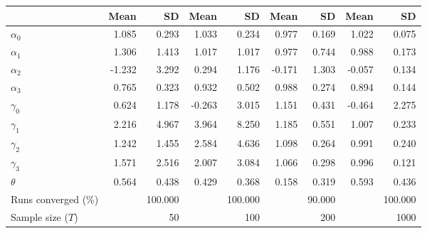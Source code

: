 
\begin{tabular}[t]{lrrrrrrrr}
\toprule
  & Mean & SD & Mean  & SD  & Mean   & SD   & Mean    & SD   \\
\midrule
$\alpha_{0}$ & 1.085 & 0.293 & 1.033 & 0.234 & 0.977 & 0.169 & 1.022 & 0.075\\
$\alpha_{1}$ & 1.306 & 1.413 & 1.017 & 1.017 & 0.977 & 0.744 & 0.988 & 0.173\\
$\alpha_{2}$ & -1.232 & 3.292 & 0.294 & 1.176 & -0.171 & 1.303 & -0.057 & 0.134\\
$\alpha_{3}$ & 0.765 & 0.323 & 0.932 & 0.502 & 0.988 & 0.274 & 0.894 & 0.144\\
$\gamma_{0}$ & 0.624 & 1.178 & -0.263 & 3.015 & 1.151 & 0.431 & -0.464 & 2.275\\
$\gamma_{1}$ & 2.216 & 4.967 & 3.964 & 8.250 & 1.185 & 0.551 & 1.007 & 0.233\\
$\gamma_{2}$ & 1.242 & 1.455 & 2.584 & 4.636 & 1.098 & 0.264 & 0.991 & 0.240\\
$\gamma_{3}$ & 1.571 & 2.516 & 2.007 & 3.084 & 1.066 & 0.298 & 0.996 & 0.121\\
$\theta$ & 0.564 & 0.438 & 0.429 & 0.368 & 0.158 & 0.319 & 0.593 & 0.436\\
Runs converged (\%) &  & 100.000 &  & 100.000 &  & 90.000 &  & 100.000\\
Sample size ($T$) &  & 50 &  & 100 &  & 200 &  & 1000\\
\bottomrule
\end{tabular}
